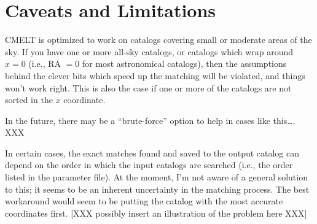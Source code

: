 \documentclass[10pt]{article}
\begin{document}
\section{Caveats and Limitations}

CMELT is optimized to work on catalogs covering small or moderate
areas of the sky.  If you have one or more all-sky catalogs, or
catalogs which wrap around $x = 0$ (i.e., RA $= 0$ for most
astronomical catalogs), then the assumptions behind the clever bits
which speed up the matching will be violated, and things won't work
right.  This is also the case if one or more of the catalogs are not
sorted in the $x$ coordinate.

In the future, there may be a ``brute-force'' option to help in cases 
like this\ldots. XXX

In certain cases, the exact matches found and saved to the 
output catalog can depend on the order in which the input catalogs 
are searched (i.e., the order listed in the parameter file).  At the 
moment, I'm not aware of a general solution to this; it seems to be an 
inherent uncertainty in the matching process.  The best workaround 
would seem to be putting the catalog with the most accurate 
coordinates first.  [XXX possibly insert an illustration of the 
problem here XXX]
\end{document}
